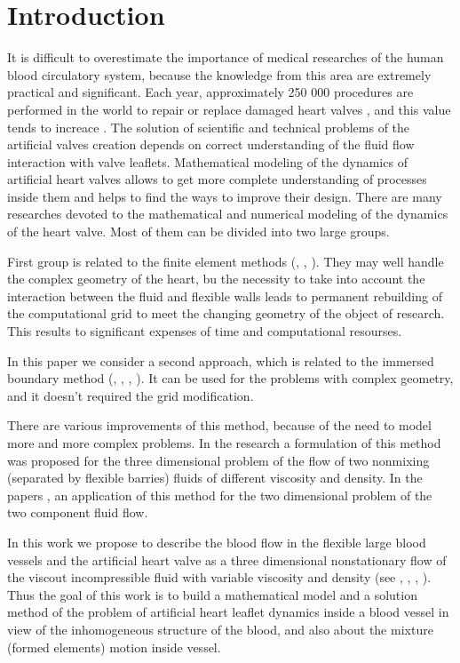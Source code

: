 \documentclass[runningheads,a4paper]{llncs}
\begin{document}
\section{Introduction}
It is difficult to overestimate the importance of medical researches of the human blood circulatory system,
because the knowledge from this area are extremely practical and significant. Each year, approximately 250 000
procedures are performed in the world to repair or replace damaged heart valves \cite{yoganathan}, and this
value tends to increace \cite{yacoub}. The solution of scientific and technical problems of the artificial valves 
creation depends on correct understanding of the fluid flow interaction with valve leaflets. Mathematical modeling
of the dynamics of artificial heart valves allows to get more complete understanding of processes inside them and helps
to find the ways to improve their design. There are many researches devoted to the mathematical and numerical modeling
of the dynamics of the heart valve. Most of them can be divided into two large groups.

First group is related to the finite element methods (\cite{taylor}, \cite{zhang}, \cite{black}). They may well handle
the complex geometry of the heart, bu the necessity to take into account the interaction between the fluid and flexible walls
leads to permanent rebuilding of the computational grid to meet the changing geometry of the object of research.
This results to significant expenses of time and computational resourses.

In this paper we consider a second approach, which is related to the immersed boundary method (\cite{pescin_1977},
\cite{boyce_2011}, \cite{ma_x_2013}, \cite{pilhwa_2010}). It can be used for the problems with complex geometry, and it doesn't
required the grid modification.

There are various improvements of this method, because of the need to model more and more complex problems. In the research \cite{fai_2013}
a formulation of this method was proposed for the three dimensional problem of the flow of two nonmixing (separated by flexible barries)
fluids of different viscosity and density. In the papers \cite{jian}, \cite{lee} an application of this method for the two dimensional problem of
the two component fluid flow.

In this work we propose to describe the blood flow in the flexible large blood vessels and the artificial heart valve as a three dimensional
nonstationary flow of the viscout incompressible fluid with variable viscosity and density (see \cite{gummel}, \cite{geidarov},
\cite{milosevic}, \cite{dolgov}). Thus the goal of this work is to build a mathematical model and a solution method of the problem
of artificial heart leaflet dynamics inside a blood vessel in view of the inhomogeneous structure of the blood, and also about the
mixture (formed elements) motion inside vessel.
\end{document}
